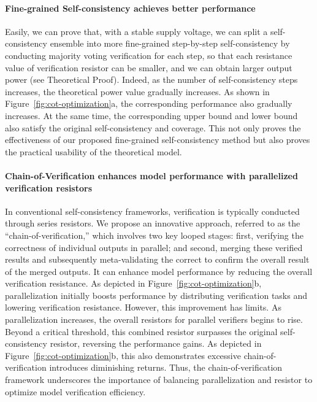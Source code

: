 \paragraph{Fine-grained Self-consistency achieves better performance}
Easily, we can prove that, with a stable supply voltage, we can split a self-consistency ensemble into more fine-grained step-by-step self-consistency by conducting majority voting verification for each step, so that each resistance value of verification resistor can be smaller, and we can obtain larger output power (see Theoretical Proof). Indeed, as the number of self-consistency steps increases, the theoretical power value gradually increases. As shown in Figure~\ref{fig:cot-optimization}a, the corresponding performance also gradually increases. At the same time, the corresponding upper bound and lower bound also satisfy the original self-consistency and coverage. This not only proves the effectiveness of our proposed fine-grained self-consistency method but also proves the practical usability of the theoretical model.



\paragraph{Chain-of-Verification enhances model performance with parallelized verification resistors}
In conventional self-consistency frameworks, verification is typically conducted through series resistors. We propose an innovative approach, referred to as the ``chain-of-verification,'' which involves two key looped stages: first, verifying the correctness of individual outputs in parallel; and second, merging these verified results and subsequently meta-validating the correct to confirm the overall result of the merged outputs. It can enhance model performance by reducing the overall verification resistance. As depicted in Figure~\ref{fig:cot-optimization}b, parallelization initially boosts performance by distributing verification tasks and lowering verification resistance.
However, this improvement has limits. As parallelization increases, the overall resistors for parallel verifiers begins to rise. Beyond a critical threshold, this combined resistor surpasses the original self-consistency resistor, reversing the performance gains. As depicted in Figure~\ref{fig:cot-optimization}b, this also demonstrates excessive chain-of-verification introduces diminishing returns. Thus, the chain-of-verification framework underscores the importance of balancing parallelization and resistor to optimize model verification efficiency.


